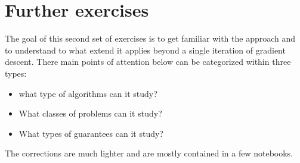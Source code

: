 \documentclass[11pt,a4paper]{article}
\begin{document}
	\section{Further exercises}\label{s:exo}		%
	The goal of this second set of exercises is to get familiar with the approach and to understand to what extend it applies beyond a single iteration of gradient descent. There main points of attention below can be categorized within three types:
	\begin{itemize}
	\item what type of algorithms can it study?
	\item What classes of problems can it study?
	\item What types of guarantees can it study?
	\end{itemize}
The corrections are much lighter and are mostly contained in a few notebooks.
\end{document}
